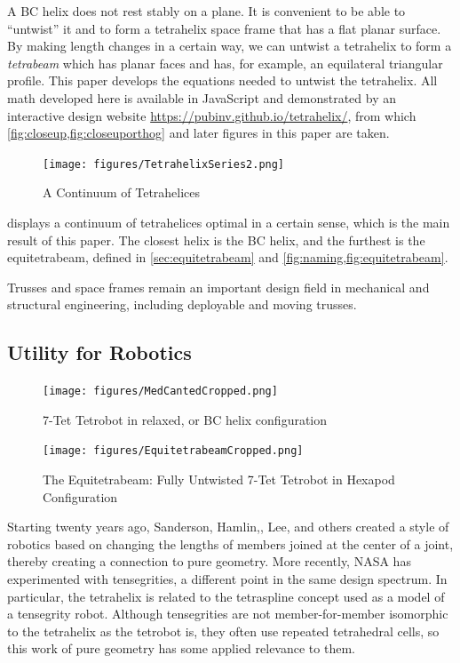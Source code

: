 \documentclass[twocolumn,10pt]{asme2ej}
\begin{document}
A BC helix does not rest stably on a plane. It is convenient to
be able to ``untwist'' it and to form a tetrahelix space frame that has a
flat planar surface. By making length changes in a certain way, we can
untwist a tetrahelix to form a \emph{tetrabeam} which has planar faces
and has, for example, an equilateral triangular profile. This paper
develops the equations needed to untwist the tetrahelix. All math
developed here is available in JavaScript and demonstrated by an interactive
design website \url{https://pubinv.github.io/tetrahelix/}\cite{readtetrahelix},
from which \cref{fig:closeup,fig:closeuporthog} and later figures in this paper 
are taken.

\begin{figure}
  \centering
     \texttt{[image: figures/TetrahelixSeries2.png]}
     \caption{A Continuum of Tetrahelices}
  \label{fig:series}
\end{figure}


 displays a continuum of tetrahelices optimal in a certain sense,
which is the main result of this
paper. The closest helix is the BC helix, and the furthest
is the equitetrabeam, defined in \cref{sec:equitetrabeam} and \cref{fig:naming,fig:equitetrabeam}.

Trusses and space frames remain an important design field in
mechanical and structural engineering\cite{mikulas1985sequentially},
including deployable and moving trusses\cite{claypool2012readily,gezgin2017new}.

\subsection{Utility for Robotics}

\begin{figure}
  \centering
     \texttt{[image: figures/MedCantedCropped.png]}
     \caption{7-Tet Tetrobot in relaxed, or BC helix configuration}
     \texttt{[image: figures/EquitetrabeamCropped.png]}
     \caption{The Equitetrabeam: Fully Untwisted 7-Tet Tetrobot in Hexapod Configuration}
     \label{fig:tetrobot}
\end{figure}

Starting twenty years ago, Sanderson\cite{sanderson1996modular},
Hamlin,\cite{TetrobotBook}, Lee\cite{lee2002dynamic}, and others
 created a style of robotics based on changing
the lengths of members joined at the center of a joint, thereby
creating a connection to pure geometry. More recently, NASA has
experimented with tensegrities\cite{NTRT,chen2017soft}, a different point in the
same design spectrum. In particular, the tetrahelix is related to the
tetraspline\cite{mirletz2014} concept used as a model of a tensegrity robot.
Although tensegrities are not member-for-member isomorphic to the tetrahelix
as the tetrobot is, they often use repeated tetrahedral cells, so this
work of pure geometry has some applied relevance to them.
\end{document}
